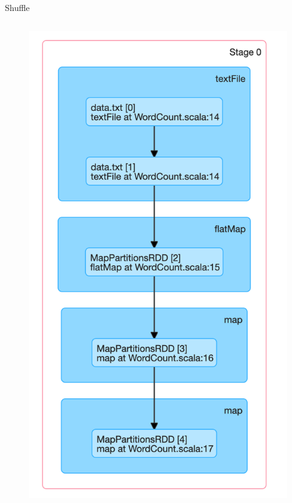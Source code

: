 \begin{frame}[plain,t]{Shuffle} %
	 \\  \vspace{2ex}
\begin{columns}[c]  %
	\column{4cm}  %
	\begin{figure}
		\centering
		\includegraphics[width=1\linewidth]{images/p006}

\end{figure}
\end{columns}
\end{frame}
